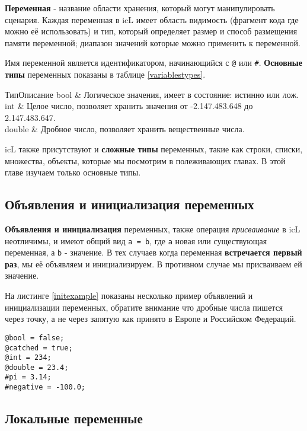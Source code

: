 \documentclass[a4paper, 14pt]{extarticle}
\begin{document}
	\textbf{Переменная} - название области хранения, который могут манипулировать сценария. Каждая переменная в icL имеет область видимость (фрагмент кода где можно её использовать) и тип, который определяет размер и способ размещения памяти переменной; диапазон значений которые можно применить к переменной.
	
	Имя переменной является идентификатором, начинающийся с \lstinline`@` или {\color{blue2}\lstinline`#`}.
	\textbf{Основные типы} переменных показаны в таблице \ref{variablestypes}.

%
	{Тип}{Описание}%
	{ 
	bool & Логическое значения, имеет в состояние: истинно или лож. \\ \hline
	int & Целое число, позволяет хранить значения от -2.147.483.648 до 2.147.483.647. \\ \hline
	double & Дробное число, позволяет хранить вещественные числа. \\
	}
	
	icL также присутствуют и \textbf{сложные типы} переменных, такие как строки, списки, множества, объекты, которые мы посмотрим в полеживающих главах. В этой главе изучаем только основные типы.
	
\subsection{Объявления и инициализация переменных}
	
	\textbf{Объявления и инициализация} переменных, также операция \textit{присваивание} в icL неотличимы, и имеют общий вид \lstinline`a = b`, где \lstinline`a` новая или существующая переменная, а \lstinline`b` - значение. В тех случаев когда переменная \textbf{встречается первый раз}, мы её объявляем и инициализируем. В противном случае мы присваиваем ей значение.
	
	На листинге \ref{initexample} показаны несколько пример объявлений и инициализации переменных, обратите внимание что дробные числа пишется через точку, а не через запятую как принято в Европе и Российском Федераций.
  	
\begin{lstlisting}[caption=Пример объявлений и инициализации переменных,label=initexample]
@bool = false;
@catched = true;
@int = 234;
@double = 23.4;
#pi = 3.14;
#negative = -100.0;
\end{lstlisting}

\subsection{Локальные переменные}
	
\end{document}
